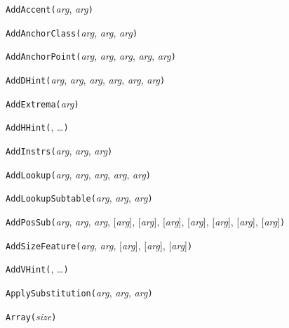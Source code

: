 \noindent\texttt{AddAccent(}\textit{arg}, \textit{arg}\texttt{)}


\noindent\texttt{AddAnchorClass(}\textit{arg}, \textit{arg}, \textit{arg}\texttt{)}


\noindent\texttt{AddAnchorPoint(}\textit{arg}, \textit{arg}, \textit{arg}, \textit{arg}, \textit{arg}\texttt{)}


\noindent\texttt{AddDHint(}\textit{arg}, \textit{arg}, \textit{arg}, \textit{arg}, \textit{arg}, \textit{arg}\texttt{)}


\noindent\texttt{AddExtrema(}\textit{arg}\texttt{)}


\noindent\texttt{AddHHint(}, \ldots\texttt{)}


\noindent\texttt{AddInstrs(}\textit{arg}, \textit{arg}, \textit{arg}\texttt{)}


\noindent\texttt{AddLookup(}\textit{arg}, \textit{arg}, \textit{arg}, \textit{arg}, \textit{arg}\texttt{)}


\noindent\texttt{AddLookupSubtable(}\textit{arg}, \textit{arg}, \textit{arg}\texttt{)}


\noindent\texttt{AddPosSub(}\textit{arg}, \textit{arg}, \textit{arg}, [\textit{arg}], [\textit{arg}], [\textit{arg}], [\textit{arg}], [\textit{arg}], [\textit{arg}], [\textit{arg}]\texttt{)}


\noindent\texttt{AddSizeFeature(}\textit{arg}, \textit{arg}, [\textit{arg}], [\textit{arg}], [\textit{arg}]\texttt{)}


\noindent\texttt{AddVHint(}, \ldots\texttt{)}


\noindent\texttt{ApplySubstitution(}\textit{arg}, \textit{arg}, \textit{arg}\texttt{)}


\noindent\texttt{Array(}\textit{size}\texttt{)}

